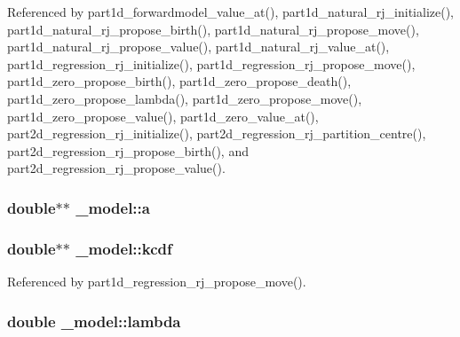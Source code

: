 Referenced by part1d\+\_\+forwardmodel\+\_\+value\+\_\+at(), part1d\+\_\+natural\+\_\+rj\+\_\+initialize(), part1d\+\_\+natural\+\_\+rj\+\_\+propose\+\_\+birth(), part1d\+\_\+natural\+\_\+rj\+\_\+propose\+\_\+move(), part1d\+\_\+natural\+\_\+rj\+\_\+propose\+\_\+value(), part1d\+\_\+natural\+\_\+rj\+\_\+value\+\_\+at(), part1d\+\_\+regression\+\_\+rj\+\_\+initialize(), part1d\+\_\+regression\+\_\+rj\+\_\+propose\+\_\+move(), part1d\+\_\+zero\+\_\+propose\+\_\+birth(), part1d\+\_\+zero\+\_\+propose\+\_\+death(), part1d\+\_\+zero\+\_\+propose\+\_\+lambda(), part1d\+\_\+zero\+\_\+propose\+\_\+move(), part1d\+\_\+zero\+\_\+propose\+\_\+value(), part1d\+\_\+zero\+\_\+value\+\_\+at(), part2d\+\_\+regression\+\_\+rj\+\_\+initialize(), part2d\+\_\+regression\+\_\+rj\+\_\+partition\+\_\+centre(), part2d\+\_\+regression\+\_\+rj\+\_\+propose\+\_\+birth(), and part2d\+\_\+regression\+\_\+rj\+\_\+propose\+\_\+value().

\subsubsection[{\texorpdfstring{a}{a}}]{\setlength{\rightskip}{0pt plus 5cm}double$\ast$$\ast$ \+\_\+model\+::a}\hypertarget{struct__model_ae1b927a6a6ea553746a18852fce04874}{}\label{struct__model_ae1b927a6a6ea553746a18852fce04874}
\subsubsection[{\texorpdfstring{kcdf}{kcdf}}]{\setlength{\rightskip}{0pt plus 5cm}double$\ast$$\ast$ \+\_\+model\+::kcdf}\hypertarget{struct__model_ace71ef84e09f7e3ffe9485c60e1c8f2d}{}\label{struct__model_ace71ef84e09f7e3ffe9485c60e1c8f2d}


Referenced by part1d\+\_\+regression\+\_\+rj\+\_\+propose\+\_\+move().

\subsubsection[{\texorpdfstring{lambda}{lambda}}]{\setlength{\rightskip}{0pt plus 5cm}double \+\_\+model\+::lambda}\hypertarget{struct__model_ad249a816f81bed8a702f24d2be8c1dfe}{}\label{struct__model_ad249a816f81bed8a702f24d2be8c1dfe}


